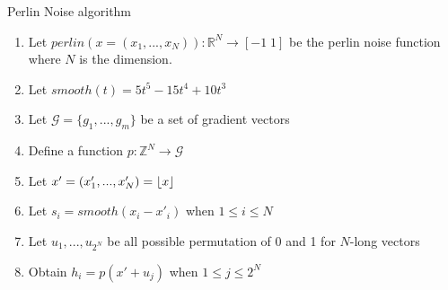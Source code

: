 \documentclass[12pt]{article}
\DeclarePairedDelimiter\floor{\lfloor}{\rfloor}
\theoremstyle{definition}
\theoremstyle{remark}
\begin{document}
\maketitle

Perlin Noise algorithm

\begin{enumerate}
	\item Let $perlin(x = (x_1, ..., x_N)): \mathbb{R}^N \rightarrow [-1 \; 1]$ be the perlin noise function where $N$ is the dimension.
	\item Let $smooth(t) = 5t^5 - 15t^4 + 10t^3$
	\item Let $\mathscr{G} = \{ g_1, ..., g_m \}$ be a set of gradient vectors
	\item Define a function $p: \mathbb{Z}^N \rightarrow \mathscr{G}$
	\item Let $x' = (x'_1, ..., x'_N) = \floor{x}$
	\item Let $s_i = smooth(x_i - x'_i)$ when $1 \leq i \leq N$
	\item Let $u_1, ..., u_{2^N}$ be all possible permutation of 0 and 1 for $N$-long vectors
	\item Obtain $h_i = p(x' + u_j)$ when $1 \leq j \leq 2^N$
\end{enumerate}
\end{document}
